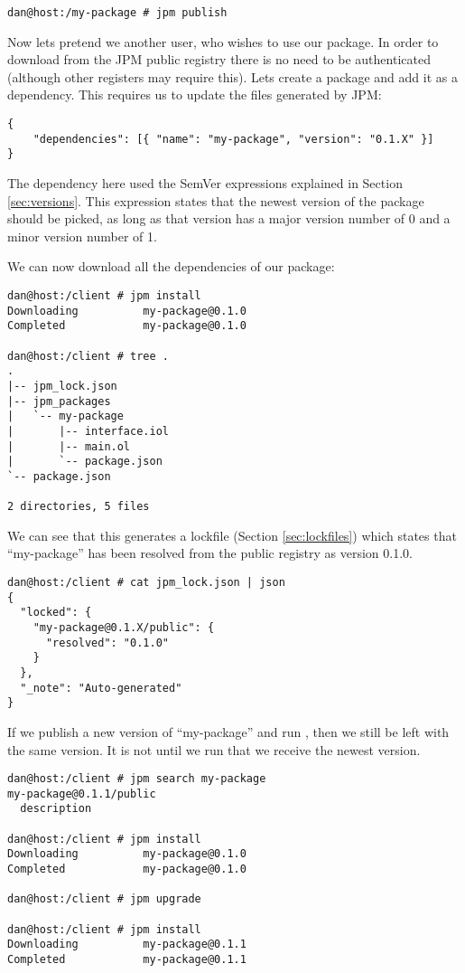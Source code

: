 \begin{verbatim}
dan@host:/my-package # jpm publish
\end{verbatim}

Now lets pretend we another user, who wishes to use our package. In order to
download from the JPM public registry there is no need to be authenticated
(although other registers may require this). Lets create a package and add it
as a dependency. This requires us to update the  files
generated by JPM:

\begin{verbatim}
{
    "dependencies": [{ "name": "my-package", "version": "0.1.X" }]
}
\end{verbatim}

The dependency here used the SemVer expressions explained in Section
\ref{sec:versions}. This expression states that the newest version of the
package should be picked, as long as that version has a major version number of
0 and a minor version number of 1.

We can now download all the dependencies of our package:

\begin{verbatim}
dan@host:/client # jpm install
Downloading          my-package@0.1.0
Completed            my-package@0.1.0

dan@host:/client # tree .
.
|-- jpm_lock.json
|-- jpm_packages
|   `-- my-package
|       |-- interface.iol
|       |-- main.ol
|       `-- package.json
`-- package.json

2 directories, 5 files
\end{verbatim}

We can see that this generates a lockfile (Section \ref{sec:lockfiles}) which
states that ``my-package'' has been resolved from the public registry as
version 0.1.0.

\begin{verbatim}
dan@host:/client # cat jpm_lock.json | json
{
  "locked": {
    "my-package@0.1.X/public": {
      "resolved": "0.1.0"
    }
  },
  "_note": "Auto-generated"
}
\end{verbatim}

If we publish a new version of ``my-package'' and run , then
we still be left with the same version. It is not until we run 
that we receive the newest version.

\begin{verbatim}
dan@host:/client # jpm search my-package
my-package@0.1.1/public
  description

dan@host:/client # jpm install
Downloading          my-package@0.1.0
Completed            my-package@0.1.0

dan@host:/client # jpm upgrade

dan@host:/client # jpm install
Downloading          my-package@0.1.1
Completed            my-package@0.1.1
\end{verbatim}

